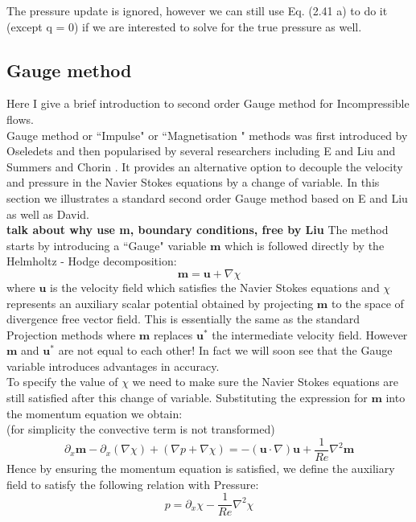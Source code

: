 The pressure update is ignored, however we can still use Eq. (2.41 a) to do it (except q = 0) if we are interested to solve for the true pressure as well.

\subsection{Gauge method}
Here I give a brief introduction to second order Gauge method for Incompressible flows.\\

Gauge method or ``Impulse" or ``Magnetisation " methods was first introduced by Oseledets and then popularised by several researchers including E and Liu and Summers and Chorin \cite{brown2001accurate,weinan2003gauge}. It provides an alternative option to decouple the velocity and pressure in the Navier Stokes equations by a change of variable. In this section we illustrates a standard second order Gauge method based on E and Liu as well as David. \\
\textbf{talk about why use m, boundary conditions, free by Liu}
The method starts by introducing a ``Gauge" variable $\textbf{m}$ which is followed directly by the Helmholtz - Hodge decomposition:
\begin{equation}
\textbf{m} = \textbf{u} + \nabla \chi
\end{equation}
where $\textbf{u}$ is the velocity field which satisfies the Navier Stokes equations and $\chi$ represents an  auxiliary scalar potential obtained by projecting $\textbf{m}$ to the space of divergence free vector field. This is essentially the same as the standard Projection methods where $\textbf{m}$ replaces $\textbf{u}^*$ the intermediate velocity field. However $\textbf{m}$ and $\textbf{u}^*$ are not equal to each other! In fact we will soon see that the Gauge variable introduces advantages in accuracy.\\

To specify the value of $\chi$ we need to make sure the Navier Stokes equations are still satisfied after this change of variable. Substituting the expression for $\textbf{m}$ into the momentum equation we obtain:\\
(for simplicity the convective term is not transformed)
\begin{equation*}
\partial_x\textbf{m} - \partial_x(\nabla \chi) + \left(\nabla p + \nabla \chi\right) = -(\textbf{u} \cdot \nabla)\textbf{u} + \dfrac{1}{Re}\nabla^2\textbf{m} 
\end{equation*}
Hence by ensuring the momentum equation is satisfied, we define the auxiliary field to satisfy the following relation with Pressure:
\begin{equation*}
p = \partial_x\chi - \dfrac{1}{Re}\nabla^2\chi
\end{equation*}

